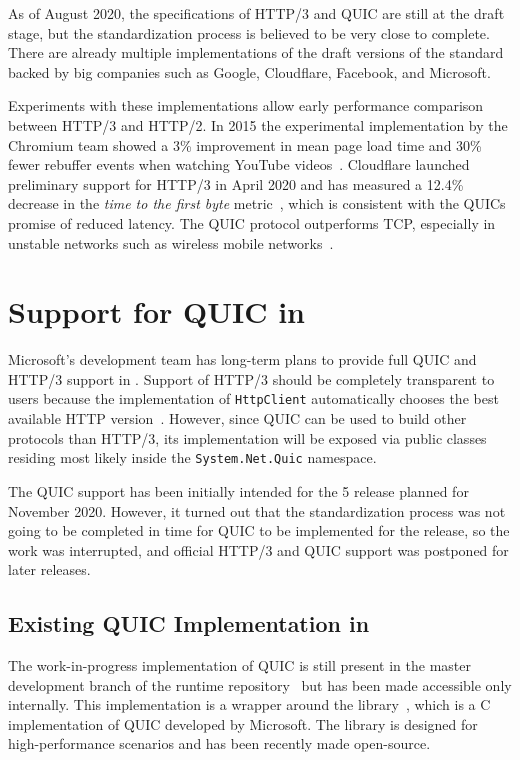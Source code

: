 As of August 2020, the specifications of HTTP/3 and QUIC are still at the draft stage, but the
standardization process is believed to be very close to complete. There are already multiple
implementations of the draft versions of the standard backed by big companies such as Google,
Cloudflare, Facebook, and Microsoft.

Experiments with these implementations allow early performance comparison between HTTP/3 and HTTP/2.
In 2015 the experimental implementation by the Chromium team showed a 3\% improvement in mean page
load time and 30\% fewer rebuffer events when watching YouTube videos~\cite{Wilk2015}. Cloudflare
launched preliminary support for HTTP/3 in April 2020 and has measured a 12.4\% decrease in the
\textit{time to the first byte} metric~\cite{Tellakula2020}, which is consistent with the QUICs
promise of reduced latency. The QUIC protocol outperforms TCP, especially in unstable networks such
as wireless mobile networks~\cite{Cook2017}.

\section{Support for QUIC in \dotnet{}}

Microsoft's \dotnet{} development team has long-term plans to provide full QUIC and HTTP/3 support
in \dotnet{}. Support of HTTP/3 should be completely transparent to users because the implementation
of \texttt{HttpClient} automatically chooses the best available HTTP version~\cite{HttpClientDocs}.
However, since QUIC can be used to build other protocols than HTTP/3, its implementation will be
exposed via public classes residing most likely inside the \texttt{System.Net.Quic} namespace.

The QUIC support has been initially intended for the \dotnet{} 5 release planned for November 2020.
However, it turned out that the standardization process was not going to be completed in time for
QUIC to be implemented for the release, so the work was interrupted, and official HTTP/3 and QUIC
support was postponed for later releases.

\subsection*{Existing QUIC Implementation in \dotnet{}}

The work-in-progress implementation of QUIC is still present in the master development branch of the
\dotnet{} runtime repository~\cite{dotnetGithub} but has been made accessible only internally. This
implementation is a wrapper around the \libmsquic{} library~\cite{msquicGithub}, which is a C
implementation of QUIC developed by Microsoft. The \libmsquic{} library is designed for
high-performance scenarios and has been recently made open-source.

